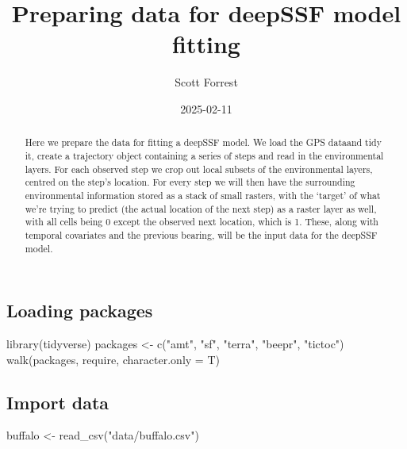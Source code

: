 \documentclass[
  letterpaper,
  DIV=11,
  numbers=noendperiod]{scrartcl}
\title{Preparing data for deepSSF model fitting}
\author{Scott Forrest}
\date{2025-02-11}
\newenvironment{Shaded}{\begin{snugshade}}{\end{snugshade}}
\newcommand{\AttributeTok}[1]{\textcolor[rgb]{0.40,0.45,0.13}{#1}}
\newcommand{\FunctionTok}[1]{\textcolor[rgb]{0.28,0.35,0.67}{#1}}
\newcommand{\NormalTok}[1]{\textcolor[rgb]{0.00,0.23,0.31}{#1}}
\newcommand{\OtherTok}[1]{\textcolor[rgb]{0.00,0.23,0.31}{#1}}
\newcommand{\StringTok}[1]{\textcolor[rgb]{0.13,0.47,0.30}{#1}}
\renewcommand*\contentsname{Table of contents}
\newcommand\contentsname{Table of contents}
\begin{document}
\maketitle
\begin{abstract}
Here we prepare the data for fitting a deepSSF model. We load the GPS
dataand tidy it, create a trajectory object containing a series of steps
and read in the environmental layers. For each observed step we crop out
local subsets of the environmental layers, centred on the step's
location. For every step we will then have the surrounding environmental
information stored as a stack of small rasters, with the `target' of
what we're trying to predict (the actual location of the next step) as a
raster layer as well, with all cells being 0 except the observed next
location, which is 1. These, along with temporal covariates and the
previous bearing, will be the input data for the deepSSF model.
\end{abstract}

\renewcommand*\contentsname{Table of contents}
{
\hypersetup{linkcolor=}
\setcounter{tocdepth}{3}
\tableofcontents
}

\subsection{Loading packages}\label{loading-packages}

\begin{Shaded}
\begin{Highlighting}[]
\FunctionTok{library}\NormalTok{(tidyverse)}
\NormalTok{packages }\OtherTok{\textless{}{-}} \FunctionTok{c}\NormalTok{(}\StringTok{"amt"}\NormalTok{, }\StringTok{"sf"}\NormalTok{, }\StringTok{"terra"}\NormalTok{, }\StringTok{"beepr"}\NormalTok{, }\StringTok{"tictoc"}\NormalTok{)}
\FunctionTok{walk}\NormalTok{(packages, require, }\AttributeTok{character.only =}\NormalTok{ T)}
\end{Highlighting}
\end{Shaded}

\subsection{Import data}\label{import-data}

\begin{Shaded}
\begin{Highlighting}[]
\NormalTok{buffalo }\OtherTok{\textless{}{-}} \FunctionTok{read\_csv}\NormalTok{(}\StringTok{"data/buffalo.csv"}\NormalTok{)}
\end{Highlighting}
\end{Shaded}
\end{document}
